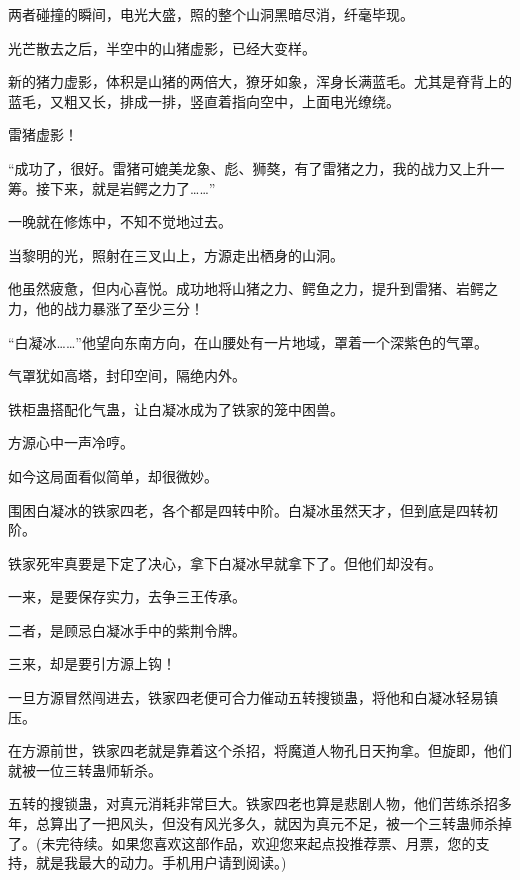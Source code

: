 \begin{this_body}
两者碰撞的瞬间，电光大盛，照的整个山洞黑暗尽消，纤毫毕现。

光芒散去之后，半空中的山猪虚影，已经大变样。

新的猪力虚影，体积是山猪的两倍大，獠牙如象，浑身长满蓝毛。尤其是脊背上的蓝毛，又粗又长，排成一排，竖直着指向空中，上面电光缭绕。

雷猪虚影！

“成功了，很好。雷猪可媲美龙象、彪、狮獒，有了雷猪之力，我的战力又上升一筹。接下来，就是岩鳄之力了……”

一晚就在修炼中，不知不觉地过去。

当黎明的光，照射在三叉山上，方源走出栖身的山洞。

他虽然疲惫，但内心喜悦。成功地将山猪之力、鳄鱼之力，提升到雷猪、岩鳄之力，他的战力暴涨了至少三分！

“白凝冰……”他望向东南方向，在山腰处有一片地域，罩着一个深紫色的气罩。

气罩犹如高塔，封印空间，隔绝内外。

铁柜蛊搭配化气蛊，让白凝冰成为了铁家的笼中困兽。

方源心中一声冷哼。

如今这局面看似简单，却很微妙。

围困白凝冰的铁家四老，各个都是四转中阶。白凝冰虽然天才，但到底是四转初阶。

铁家死牢真要是下定了决心，拿下白凝冰早就拿下了。但他们却没有。

一来，是要保存实力，去争三王传承。

二者，是顾忌白凝冰手中的紫荆令牌。

三来，却是要引方源上钩！

一旦方源冒然闯进去，铁家四老便可合力催动五转搜锁蛊，将他和白凝冰轻易镇压。

在方源前世，铁家四老就是靠着这个杀招，将魔道人物孔日天拘拿。但旋即，他们就被一位三转蛊师斩杀。

五转的搜锁蛊，对真元消耗非常巨大。铁家四老也算是悲剧人物，他们苦练杀招多年，总算出了一把风头，但没有风光多久，就因为真元不足，被一个三转蛊师杀掉了。(未完待续。如果您喜欢这部作品，欢迎您来起点投推荐票、月票，您的支持，就是我最大的动力。手机用户请到阅读。)

\end{this_body}

